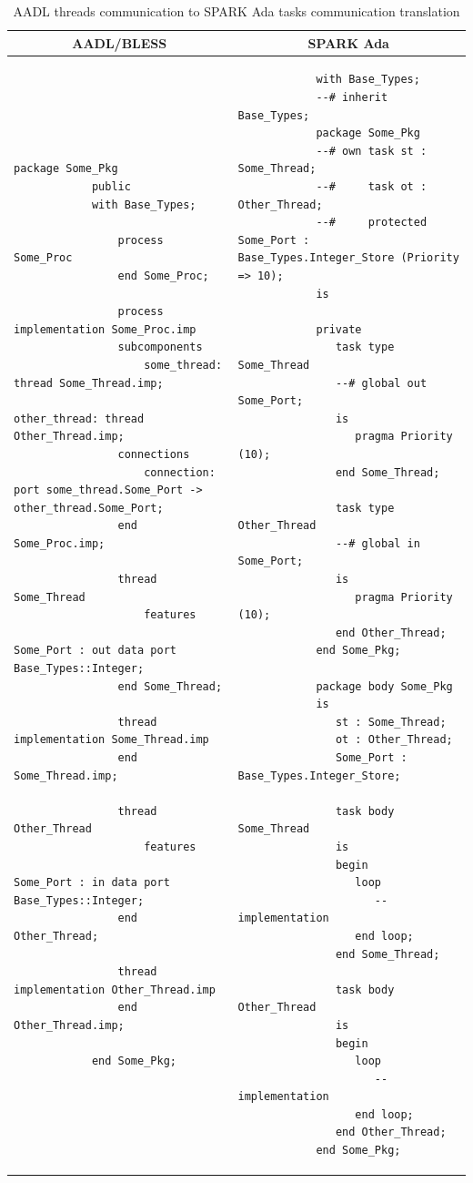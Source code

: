 \singlespacing
\begin{table}[!ht]
	\caption{AADL threads communication to SPARK Ada tasks communication translation}
	\label{table:port_communication_thread}
	\centering
  	\begin{tabular}{ | p{3in} | p{3in} |}

		\hline
		\multicolumn{1}{|c|}{\textbf{AADL/BLESS}} & \multicolumn{1}{|c|}{\textbf{SPARK Ada}} \\ \hline

		\begin{lstlisting}[language=aadl]
			package Some_Pkg
			public
			with Base_Types;

				process Some_Proc
				end Some_Proc;
				
				process implementation Some_Proc.imp
				subcomponents
					some_thread: thread Some_Thread.imp;
					other_thread: thread Other_Thread.imp;
				connections
					connection: port some_thread.Some_Port -> other_thread.Some_Port;
				end Some_Proc.imp;

				thread Some_Thread
					features
						Some_Port : out data port Base_Types::Integer;
				end Some_Thread;

				thread implementation Some_Thread.imp
				end Some_Thread.imp;
				
				thread Other_Thread
					features
						Some_Port : in data port Base_Types::Integer;
				end Other_Thread;

				thread implementation Other_Thread.imp
				end Other_Thread.imp;
							
			end Some_Pkg;
		\end{lstlisting} 
		& 
		\begin{lstlisting}
			with Base_Types;
			--# inherit Base_Types;
			package Some_Pkg
			--# own task st : Some_Thread;
			--#     task ot : Other_Thread;
			--#     protected Some_Port : Base_Types.Integer_Store (Priority => 10);
			is
			   
			private   
			   task type Some_Thread     
			   --# global out Some_Port;   
			   is
			      pragma Priority (10);
			   end Some_Thread;
			   
			   task type Other_Thread
			   --# global in Some_Port;
			   is      
			      pragma Priority (10);      
			   end Other_Thread;	   
			end Some_Pkg;

			package body Some_Pkg
			is
			   st : Some_Thread;
			   ot : Other_Thread;
			   Some_Port : Base_Types.Integer_Store;

			   task body Some_Thread
			   is   
			   begin      
			      loop         
			         -- implementation
			      end loop;      
			   end Some_Thread;
			   
			   task body Other_Thread
			   is
			   begin      
			      loop
			         -- implementation       
			      end loop;      
			   end Other_Thread;   
			end Some_Pkg;	
		\end{lstlisting} 		

		\\ \hline
	\end{tabular}
\end{table}
\doublespacing

